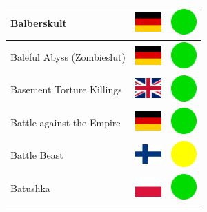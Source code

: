 \documentclass[12pt, a4paper, twoside]{report}
\begin{document}
\begin{center}
\begin{longtable}{|p{5cm}|p{2cm}|p{2cm}|}
Balberskult & \includegraphics[width=1cm]{4x3/de} & \includegraphics[width=1cm]{likes/y} \\ \hline
Baleful Abyss (Zombieslut) & \includegraphics[width=1cm]{4x3/de} & \includegraphics[width=1cm]{likes/y} \\ \hline
Basement Torture Killings & \includegraphics[width=1cm]{4x3/gb} & \includegraphics[width=1cm]{likes/y} \\ \hline
Battle against the Empire & \includegraphics[width=1cm]{4x3/de} & \includegraphics[width=1cm]{likes/y} \\ \hline
Battle Beast & \includegraphics[width=1cm]{4x3/fi} & \includegraphics[width=1cm]{likes/m} \\ \hline
Batushka & \includegraphics[width=1cm]{4x3/pl} & \includegraphics[width=1cm]{likes/y} \\ \hline

\end{longtable}
\end{center}
\end{document}
